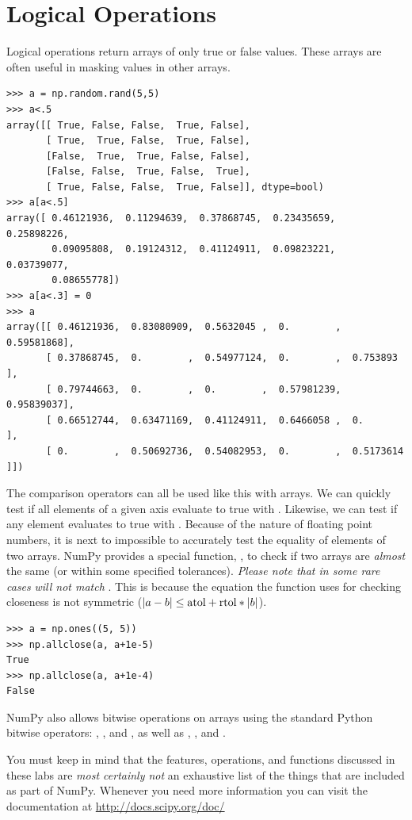 \section*{Logical Operations}
Logical operations return arrays of only true or false values.
These arrays are often useful in masking values in other arrays.
\begin{lstlisting}
>>> a = np.random.rand(5,5)
>>> a<.5
array([[ True, False, False,  True, False],
       [ True,  True, False,  True, False],
       [False,  True,  True, False, False],
       [False, False,  True, False,  True],
       [ True, False, False,  True, False]], dtype=bool)
>>> a[a<.5]
array([ 0.46121936,  0.11294639,  0.37868745,  0.23435659,  0.25898226,
        0.09095808,  0.19124312,  0.41124911,  0.09823221,  0.03739077,
        0.08655778])
>>> a[a<.3] = 0
>>> a
array([[ 0.46121936,  0.83080909,  0.5632045 ,  0.        ,  0.59581868],
       [ 0.37868745,  0.        ,  0.54977124,  0.        ,  0.753893  ],
       [ 0.79744663,  0.        ,  0.        ,  0.57981239,  0.95839037],
       [ 0.66512744,  0.63471169,  0.41124911,  0.6466058 ,  0.        ],
       [ 0.        ,  0.50692736,  0.54082953,  0.        ,  0.5173614 ]])
\end{lstlisting}
The comparison operators can all be used like this with arrays.
We can quickly test if all elements of a given axis evaluate to true with .  Likewise, we can test if any element evaluates to true with .  
Because of the nature of floating point numbers, it is next to impossible to accurately test the equality of elements of two arrays.
NumPy provides a special function, , to check if two arrays are \emph{almost} the same (or within some specified tolerances).
\emph{Please note that in some rare cases}  \emph{will not match} .
This is because the equation the function uses for checking closeness is not symmetric ($\left\lvert a-b\right\rvert \leq \mbox{atol} + \mbox{rtol}*\left\lvert b\right\rvert$).      
\begin{lstlisting}
>>> a = np.ones((5, 5))
>>> np.allclose(a, a+1e-5)
True
>>> np.allclose(a, a+1e-4)
False
\end{lstlisting}
NumPy also allows bitwise operations on arrays using the standard Python bitwise operators: \li{&}, \li{|}, and \li{^}, as well as \li{&=}, \li{|=}, and \li{^=}.

You must keep in mind that the features, operations, and functions discussed in these labs are \emph{most certainly not} an exhaustive list of the things that are included as part of NumPy.
Whenever you need more information you can visit the documentation at \url{http://docs.scipy.org/doc/}

